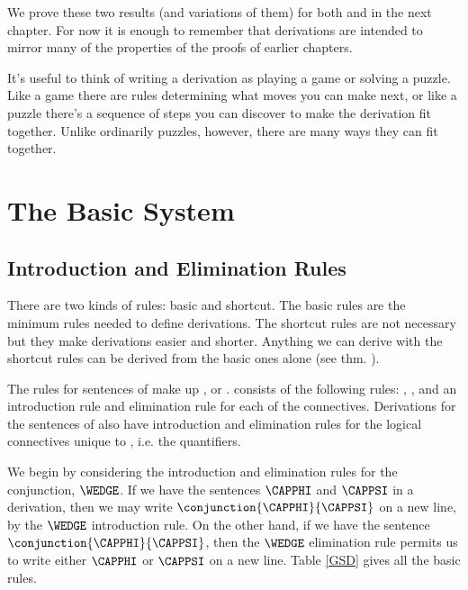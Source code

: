 We prove these two results (and variations of them) for both \GSL{} and \GQL{} in the next chapter.
For now it is enough to remember that derivations are intended to mirror many of the properties of the proofs of earlier chapters.

It's useful to think of writing a derivation as playing a game or solving a puzzle.
Like a game there are rules determining what moves you can make next, or like a puzzle there's a sequence of steps you can discover to make the derivation fit together. 
Unlike ordinarily puzzles, however, there are many ways they can fit together.

\section{The Basic System \GSD{}}

\subsection{Introduction and Elimination Rules} 
There are two kinds of rules: basic and shortcut.
The basic rules are the minimum rules needed to define derivations.
The shortcut rules are not necessary but they make derivations easier and shorter. 
Anything we can derive with the shortcut rules can be derived from the basic ones alone (see thm. ). 

The rules for sentences of \GSL{} make up , or \GSD{}. 
\GSD{} consists of the following rules: , , and an introduction rule and elimination rule for each of the \GSL{} connectives.
Derivations for the sentences of \GQL{} also have introduction and elimination rules for the logical connectives unique to \GQL{}, i.e. the quantifiers.

We begin by considering the introduction and elimination rules for the conjunction, $\WEDGE$.
If we have the sentences $\CAPPHI$ and $\CAPPSI$ in a derivation, then we may write $\conjunction{\CAPPHI}{\CAPPSI}$ on a new line, by the $\WEDGE$ introduction rule. 
On the other hand, if we have the sentence $\conjunction{\CAPPHI}{\CAPPSI}$, then the $\WEDGE$ elimination rule permits us to write either $\CAPPHI$ or $\CAPPSI$ on a new line.
Table \ref{GSD} gives all the basic \GSD{} rules.

